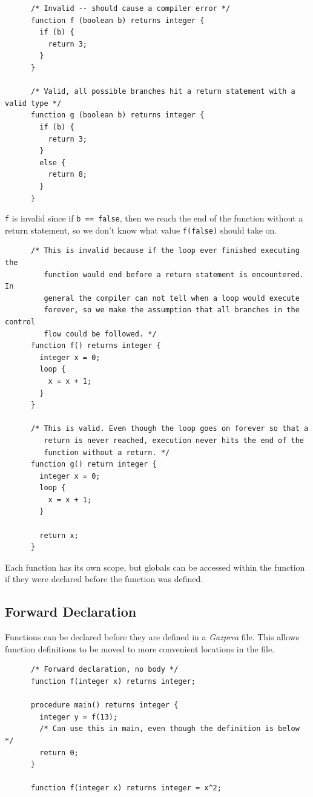 \documentclass{article}
\begin{document}
    \begin{lstlisting}
      /* Invalid -- should cause a compiler error */
      function f (boolean b) returns integer {
        if (b) {
          return 3;
        }
      }

      /* Valid, all possible branches hit a return statement with a valid type */
      function g (boolean b) returns integer {
        if (b) {
          return 3;
        }
        else {
          return 8;
        }
      }
    \end{lstlisting}

    \texttt{f} is invalid since if \texttt{b == false}, then we reach the end of the function without a return
    statement, so we don't know what value \texttt{f(false)} should take on.

    \begin{lstlisting}
      /* This is invalid because if the loop ever finished executing the
         function would end before a return statement is encountered. In
         general the compiler can not tell when a loop would execute
         forever, so we make the assumption that all branches in the control
         flow could be followed. */
      function f() returns integer {
        integer x = 0;
        loop {
          x = x + 1;
        }
      }

      /* This is valid. Even though the loop goes on forever so that a
         return is never reached, execution never hits the end of the
         function without a return. */
      function g() return integer {
        integer x = 0;
        loop {
          x = x + 1;
        }

        return x;
      }
    \end{lstlisting}

    Each function has its own scope, but globals can be accessed within the function if they were declared before
    the function was defined.

  \subsection{Forward Declaration}

    Functions can be declared before they are defined in a \textit{Gazprea} file.  This allows function definitions
    to be moved to more convenient locations in the file.

    \begin{lstlisting}
      /* Forward declaration, no body */
      function f(integer x) returns integer;

      procedure main() returns integer {
        integer y = f(13);
        /* Can use this in main, even though the definition is below */
        return 0;
      }

      function f(integer x) returns integer = x^2;
    \end{lstlisting}
\end{document}
